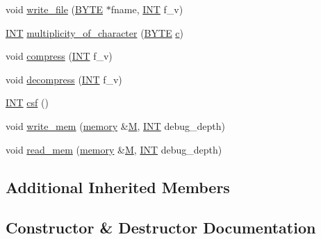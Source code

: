 \begin{DoxyCompactItemize}
\item 
void \mbox{\hyperlink{classmemory_a665547a8b8662da816c6511cabd74ea1}{write\+\_\+file}} (\mbox{\hyperlink{galois_8h_ab6cc7b4aeb6ea31aba2b3fbfc83ff5e6}{B\+Y\+TE}} $\ast$fname, \mbox{\hyperlink{galois_8h_a09fddde158a3a20bd2dcadb609de11dc}{I\+NT}} f\+\_\+v)
\item 
\mbox{\hyperlink{galois_8h_a09fddde158a3a20bd2dcadb609de11dc}{I\+NT}} \mbox{\hyperlink{classmemory_a6a5fd3fd3ace3bd98089e618ec4c1bca}{multiplicity\+\_\+of\+\_\+character}} (\mbox{\hyperlink{galois_8h_ab6cc7b4aeb6ea31aba2b3fbfc83ff5e6}{B\+Y\+TE}} \mbox{\hyperlink{alphabet2_8_c_a4e1e0e72dd773439e333c84dd762a9c3}{c}})
\item 
void \mbox{\hyperlink{classmemory_afadcbb4b0b076d7f9552a9102b467683}{compress}} (\mbox{\hyperlink{galois_8h_a09fddde158a3a20bd2dcadb609de11dc}{I\+NT}} f\+\_\+v)
\item 
void \mbox{\hyperlink{classmemory_a1b74745da801f22d42ea54e54b23c014}{decompress}} (\mbox{\hyperlink{galois_8h_a09fddde158a3a20bd2dcadb609de11dc}{I\+NT}} f\+\_\+v)
\item 
\mbox{\hyperlink{galois_8h_a09fddde158a3a20bd2dcadb609de11dc}{I\+NT}} \mbox{\hyperlink{classmemory_a7f6c3fb11d9ef25fce0aa093bc9d9216}{csf}} ()
\item 
void \mbox{\hyperlink{classmemory_aa9d91eb1dde81ccc9fc3b45c742cafc6}{write\+\_\+mem}} (\mbox{\hyperlink{classmemory}{memory}} \&\mbox{\hyperlink{plane__search_8_c_ad2d23ebd03187a91edd45b1d5e496265}{M}}, \mbox{\hyperlink{galois_8h_a09fddde158a3a20bd2dcadb609de11dc}{I\+NT}} debug\+\_\+depth)
\item 
void \mbox{\hyperlink{classmemory_abe07337c672fca9e605c5f9df86a8c1a}{read\+\_\+mem}} (\mbox{\hyperlink{classmemory}{memory}} \&\mbox{\hyperlink{plane__search_8_c_ad2d23ebd03187a91edd45b1d5e496265}{M}}, \mbox{\hyperlink{galois_8h_a09fddde158a3a20bd2dcadb609de11dc}{I\+NT}} debug\+\_\+depth)
\end{DoxyCompactItemize}
\subsection*{Additional Inherited Members}


\subsection{Constructor \& Destructor Documentation}
\mbox{\label{classmemory_a05edf03af2b4a912939e00c7269e2085}} 
